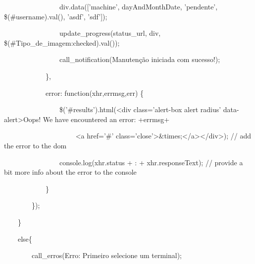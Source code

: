 {\ttfamily\color[rgb]{0.10980392,0.10980392,0.10980392}
    \ \ \ \ \ \ \ \ \ \ \ \ \ \ \ \ div.data(['machine', dayAndMonthDate, 'pendente',
            \$({\textquotedbl}\#username{\textquotedbl}).val(), 'asdf', 'sdf']);}

{\ttfamily\color[rgb]{0.10980392,0.10980392,0.10980392}
    \ \ \ \ \ \ \ \ \ \ \ \ \ \ \ \ update\_progress(status\_url, div,
            \$({\textquotedbl}\#Tipo\_de\_imagem:checked{\textquotedbl}).val());}

{\ttfamily\color[rgb]{0.10980392,0.10980392,0.10980392}
    \ \ \ \ \ \ \ \ \ \ \ \ \ \ \ \ call\_notification({\textquotedbl}Manuten\c{c}\~ao iniciada com
            sucesso!{\textquotedbl});}

{\ttfamily\color[rgb]{0.10980392,0.10980392,0.10980392}
    \ \ \ \ \ \ \ \ \ \ \ \ \},}

{\ttfamily\color[rgb]{0.10980392,0.10980392,0.10980392}
    \ \ \ \ \ \ \ \ \ \ \ \ error: function(xhr,errmsg,err) \{}

{\ttfamily\color[rgb]{0.10980392,0.10980392,0.10980392}
    \ \ \ \ \ \ \ \ \ \ \ \ \ \ \ \ \$('\#results').html({\textquotedbl}{\textless}div class='alert-box alert radius'
            data-alert{\textgreater}Oops! We have encountered an error: {\textquotedbl}+errmsg+}

            {\ttfamily\color[rgb]{0.10980392,0.10980392,0.10980392}
            \ \ \ \ \ \ \ \ \ \ \ \ \ \ \ \ \ \ \ \ {\textquotedbl} {\textless}a href='\#'
            class='close'{\textgreater}\&times;{\textless}/a{\textgreater}{\textless}/div{\textgreater}{\textquotedbl}); // add the
    error to the dom}

{\ttfamily\color[rgb]{0.10980392,0.10980392,0.10980392}
    \ \ \ \ \ \ \ \ \ \ \ \ \ \ \ \ console.log(xhr.status + {\textquotedbl}: {\textquotedbl} + xhr.responseText); //
    provide a bit more info about the error to the console}

{\ttfamily\color[rgb]{0.10980392,0.10980392,0.10980392}
    \ \ \ \ \ \ \ \ \ \ \ \ \}}

{\ttfamily\color[rgb]{0.10980392,0.10980392,0.10980392}
    \ \ \ \ \ \ \ \ \});}

{\ttfamily\color[rgb]{0.10980392,0.10980392,0.10980392}
    \ \ \ \ \}}

{\ttfamily\color[rgb]{0.10980392,0.10980392,0.10980392}
    \ \ \ \ else\{}

{\ttfamily\color[rgb]{0.10980392,0.10980392,0.10980392}
    \ \ \ \ \ \ \ \ call\_erros({\textquotedbl}Erro: Primeiro selecione um terminal{\textquotedbl});}

